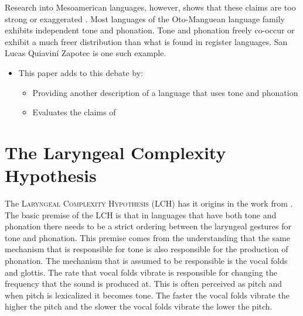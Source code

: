 \documentclass[12pt, letterpaper]{article}
\begin{document}
Research into Mesoamerican languages, however, shows that these claims are too strong or exaggerated \citep{suarezMesoamericanIndianLanguages1983,campbellMesoAmericaLinguisticArea1986,silvermanLaryngealComplexityOtomanguean1997,dicanioPhoneticsPhonologySan2008,espositoVariationContrastivePhonation2010, campbellOtomangueanHistoricalLinguistics2017a,campbellOtomangueanHistoricalLinguistics2017}. 
Most languages of the Oto-Manguean language family exhibits independent tone and phonation.
Tone and phonation freely co-occur or exhibit a much freer distribution than what is found in register languages. San Lucas Quiaviní Zapotec is one such example.


\begin{itemize}
	\item This paper adds to this debate by:
	\begin{itemize}
		\item Providing another description of a language that uses tone and phonation
		\item Evaluates the claims of \citet{silvermanLaryngealComplexityOtomanguean1997}
	\end{itemize}
\end{itemize}

\section{The Laryngeal Complexity Hypothesis} \label{sec:Silverman}

The \textsc{Laryngeal Complexity Hypothesis} (LCH) has it origins in the work from \citet{silvermanLaryngealComplexityOtomanguean1997,blankenshipTimeCourseBreathiness1997,blankenshipTimingNonmodalPhonation2002}. The basic premise of the LCH is that in languages that have both tone and phonation there needs to be a strict ordering between the laryngeal gestures for tone and phonation. This premise comes from the understanding that the same mechanism that is responsible for tone is also responsible for the production of phonation. The mechanism that is assumed to be responsible is the vocal folds and glottis. The rate that vocal folds vibrate is responsible for changing the frequency that the sound is produced at. This is often perceived as pitch and when pitch is lexicalized it becomes tone. The faster the vocal folds vibrate the higher the pitch and the slower the vocal folds vibrate the lower the pitch. 
\end{document}
